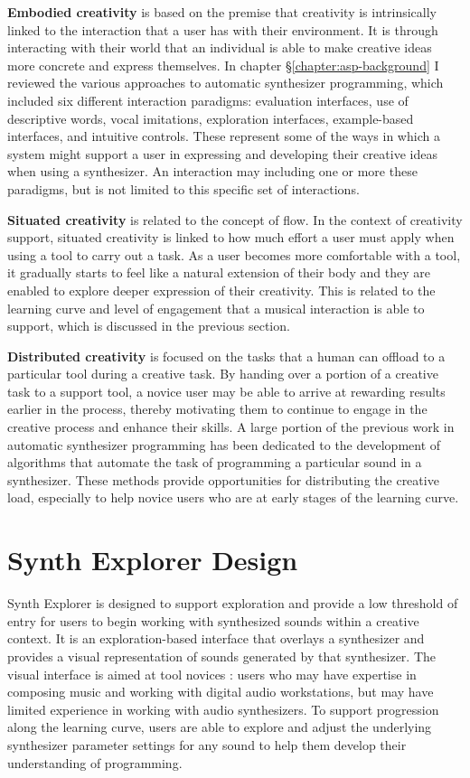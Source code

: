 \textbf{Embodied creativity} is based on the premise that creativity is intrinsically linked to the interaction that a user has with their environment. It is through interacting with their world that an individual is able to make creative ideas more concrete and express themselves. In chapter \S\ref{chapter:asp-background} I reviewed the various approaches to automatic synthesizer programming, which included six different interaction paradigms: evaluation interfaces, use of descriptive words, vocal imitations, exploration interfaces, example-based interfaces, and intuitive controls. These represent some of the ways in which a system might support a user in expressing and developing their creative ideas when using a synthesizer. An interaction may including one or more these paradigms, but is not limited to this specific set of interactions.

\textbf{Situated creativity} is related to the concept of flow. In the context of creativity support, situated creativity is linked to how much effort a user must apply when using a tool to carry out a task. As a user becomes more comfortable with a tool, it gradually starts to feel like a natural extension of their body and they are enabled to explore deeper expression of their creativity. This is related to the learning curve and level of engagement that a musical interaction is able to support, which is discussed in the previous section.

\textbf{Distributed creativity} is focused on the tasks that a human can offload to a particular tool during a creative task. By handing over a portion of a creative task to a support tool, a novice user may be able to arrive at rewarding results earlier in the process, thereby motivating them to continue to engage in the creative process and enhance their skills. A large portion of the previous work in automatic synthesizer programming has been dedicated to the development of algorithms that automate the task of programming a particular sound in a synthesizer. These methods provide opportunities for distributing the creative load, especially to help novice users who are at early stages of the learning curve.

\section{Synth Explorer Design}
Synth Explorer is designed to support exploration and provide a low threshold of entry for users to begin working with synthesized sounds within a creative context. It is an exploration-based interface that overlays a synthesizer and provides a visual representation of sounds generated by that synthesizer. The visual interface is aimed at tool novices \cite{davis2013toward}: users who may have expertise in composing music and working with digital audio workstations, but may have limited experience in working with audio synthesizers. To support progression along the learning curve, users are able to explore and adjust the underlying synthesizer parameter settings for any sound to help them develop their understanding of programming.

